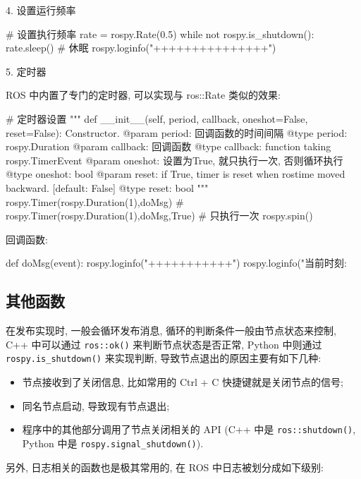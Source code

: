 \documentclass[openany, fontset=windowsold]{ctexbook}
\theoremstyle{kaiti}
\theoremstyle{normal}
\begin{document}
4. 设置运行频率

\begin{python}
  # 设置执行频率
  rate = rospy.Rate(0.5)
  while not rospy.is_shutdown():
      rate.sleep() # 休眠
      rospy.loginfo("+++++++++++++++")
\end{python}

5. 定时器

ROS 中内置了专门的定时器, 可以实现与 ros::Rate 类似的效果:

\begin{python}
  # 定时器设置
  """    
  def __init__(self, period, callback, oneshot=False, reset=False):
      Constructor.
      @param period: 回调函数的时间间隔
      @type  period: rospy.Duration
      @param callback: 回调函数
      @type  callback: function taking rospy.TimerEvent
      @param oneshot: 设置为True, 就只执行一次, 否则循环执行
      @type  oneshot: bool
      @param reset: if True, timer is reset when rostime moved backward. [default: False]
      @type  reset: bool
  """
  rospy.Timer(rospy.Duration(1),doMsg)
  # rospy.Timer(rospy.Duration(1),doMsg,True) # 只执行一次
  rospy.spin()
\end{python}

回调函数:

\begin{python}
  def doMsg(event):
      rospy.loginfo("+++++++++++")
      rospy.loginfo("当前时刻:%
\end{python}

\subsection{其他函数}

在发布实现时, 一般会循环发布消息, 循环的判断条件一般由节点状态来控制, C++ 中可以通过 \verb|ros::ok()| 来判断节点状态是否正常, Python 中则通过 \verb|rospy.is_shutdown()| 来实现判断, 导致节点退出的原因主要有如下几种:

\begin{itemize}
  \item 节点接收到了关闭信息, 比如常用的 Ctrl + C 快捷键就是关闭节点的信号; 
  \item 同名节点启动, 导致现有节点退出; 
  \item 程序中的其他部分调用了节点关闭相关的 API (C++ 中是 \verb|ros::shutdown()|, Python 中是 \verb|rospy.signal_shutdown()|).
\end{itemize}

另外, 日志相关的函数也是极其常用的, 在 ROS 中日志被划分成如下级别:
\end{document}
